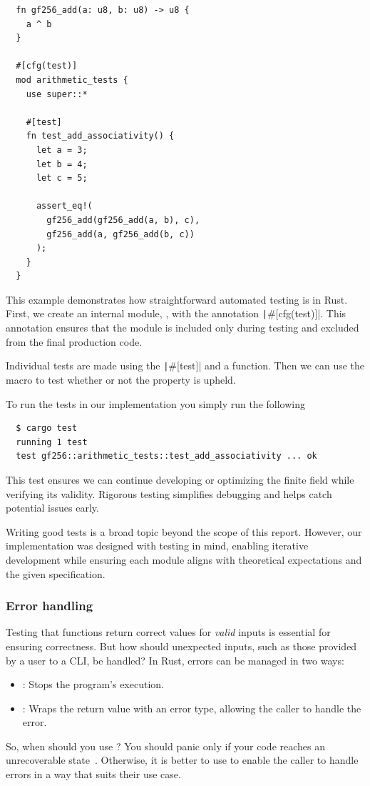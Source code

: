 \documentclass[11pt]{report}
\theoremstyle{definition}
\theoremstyle{plain}
\begin{document}
\begin{verbatim}
  fn gf256_add(a: u8, b: u8) -> u8 {
    a ^ b
  }

  #[cfg(test)]
  mod arithmetic_tests {
    use super::*
    
    #[test]
    fn test_add_associativity() {
      let a = 3;
      let b = 4;
      let c = 5;

      assert_eq!(
        gf256_add(gf256_add(a, b), c), 
        gf256_add(a, gf256_add(b, c))
      );
    }
  }
\end{verbatim}

This example demonstrates how straightforward automated testing is in Rust. First, we create an internal module, , with the annotation \texttt|#[cfg(test)]|. This annotation ensures that the module is included only during testing and excluded from the final production code.

Individual tests are made using the \texttt|#[test]| and a function. Then we can use the macro  to test whether or not the property is upheld.

To run the tests in our implementation you simply run the following
\begin{verbatim}
  $ cargo test
  running 1 test
  test gf256::arithmetic_tests::test_add_associativity ... ok
\end{verbatim}
This test ensures we can continue developing or optimizing the finite field while verifying its validity. Rigorous testing simplifies debugging and helps catch potential issues early.

Writing good tests is a broad topic beyond the scope of this report. However, our implementation was designed with testing in mind, enabling iterative development while ensuring each module aligns with theoretical expectations and the given specification.

\subsubsection{Error handling}\label{sub:rusterror}
Testing that functions return correct values for \textit{valid} inputs is essential for ensuring correctness. But how should unexpected inputs, such as those provided by a user to a CLI, be handled? In Rust, errors can be managed in two ways:
\begin{itemize}[itemsep=0pt, topsep=0pt, parsep=0pt]
  \item {}: Stops the program's execution.
  \item {}: Wraps the return value with an error type, allowing the caller to handle the error.
\end{itemize}
So, when should you use ? You should panic only if your code reaches an unrecoverable state~\cite[ch.9.3]{rustlangRustProgramming}. Otherwise, it is better to use  to enable the caller to handle errors in a way that suits their use case.
\end{document}
